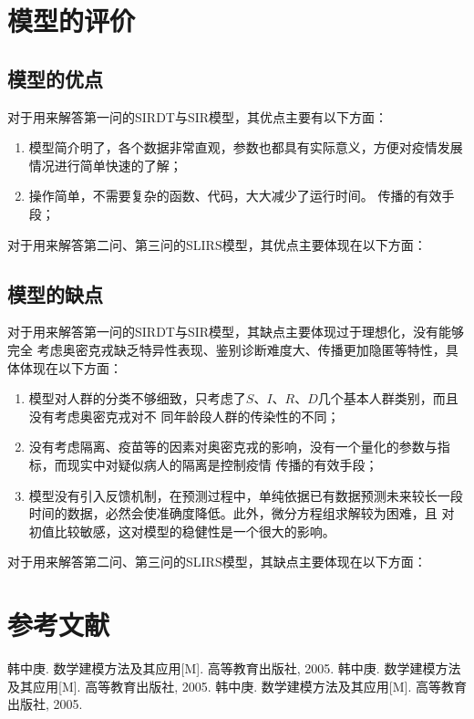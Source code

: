 \documentclass[bwprint]{gmcmthesis}
\numberwithin{figure}{section}
\begin{document}
\section{模型的评价}
\subsection{模型的优点}
\par 对于用来解答第一问的SIRDT与SIR模型，其优点主要有以下方面：
\begin{enumerate}
  \item 模型简介明了，各个数据非常直观，参数也都具有实际意义，方便对疫情发展情况进行简单快速的了解；
  \item 操作简单，不需要复杂的函数、代码，大大减少了运行时间。
  传播的有效手段；
  \end{enumerate}
\par 对于用来解答第二问、第三问的SLIRS模型，其优点主要体现在以下方面：

\subsection{模型的缺点}
\par 对于用来解答第一问的SIRDT与SIR模型，其缺点主要体现过于理想化，没有能够完全
考虑奥密克戎缺乏特异性表现、鉴别诊断难度大、传播更加隐匿等特性，具体体现在以下方面：
\begin{enumerate}
  \item 模型对人群的分类不够细致，只考虑了$S$、$I$、$R$、$D$几个基本人群类别，而且没有考虑奥密克戎对不
  同年龄段人群的传染性的不同；
  \item 没有考虑隔离、疫苗等的因素对奥密克戎的影响，没有一个量化的参数与指标，而现实中对疑似病人的隔离是控制疫情
  传播的有效手段；
  \item 模型没有引入反馈机制，在预测过程中，单纯依据已有数据预测未来较长一段时间的数据，必然会使准确度降低。此外，微分方程组求解较为困难，且
  对初值比较敏感，这对模型的稳健性是一个很大的影响。
  \end{enumerate}
\par 对于用来解答第二问、第三问的SLIRS模型，其缺点主要体现在以下方面：

\section{参考文献}
\begin{thebibliography}{1.2}%
\setlength{\itemsep}{-2mm}
 韩中庚. 数学建模方法及其应用[M]. 高等教育出版社, 2005.
 韩中庚. 数学建模方法及其应用[M]. 高等教育出版社, 2005.
 韩中庚. 数学建模方法及其应用[M]. 高等教育出版社, 2005.
\end{thebibliography}
\end{document}
